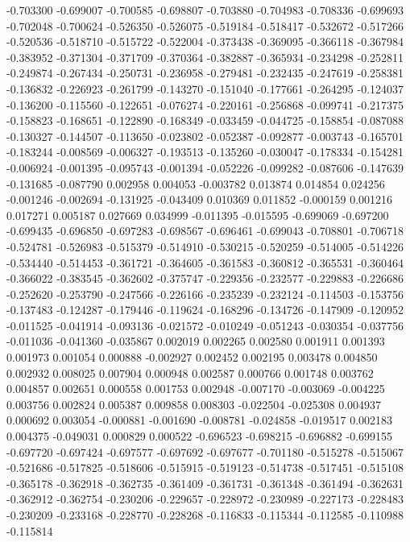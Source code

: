 -0.703300
-0.699007
-0.700585
-0.698807
-0.703880
-0.704983
-0.708336
-0.699693
-0.702048
-0.700624
-0.526350
-0.526075
-0.519184
-0.518417
-0.532672
-0.517266
-0.520536
-0.518710
-0.515722
-0.522004
-0.373438
-0.369095
-0.366118
-0.367984
-0.383952
-0.371304
-0.371709
-0.370364
-0.382887
-0.365934
-0.234298
-0.252811
-0.249874
-0.267434
-0.250731
-0.236958
-0.279481
-0.232435
-0.247619
-0.258381
-0.136832
-0.226923
-0.261799
-0.143270
-0.151040
-0.177661
-0.264295
-0.124037
-0.136200
-0.115560
-0.122651
-0.076274
-0.220161
-0.256868
-0.099741
-0.217375
-0.158823
-0.168651
-0.122890
-0.168349
-0.033459
-0.044725
-0.158854
-0.087088
-0.130327
-0.144507
-0.113650
-0.023802
-0.052387
-0.092877
-0.003743
-0.165701
-0.183244
-0.008569
-0.006327
-0.193513
-0.135260
-0.030047
-0.178334
-0.154281
-0.006924
-0.001395
-0.095743
-0.001394
-0.052226
-0.099282
-0.087606
-0.147639
-0.131685
-0.087790
0.002958
0.004053
-0.003782
0.013874
0.014854
0.024256
-0.001246
-0.002694
-0.131925
-0.043409
0.010369
0.011852
-0.000159
0.001216
0.017271
0.005187
0.027669
0.034999
-0.011395
-0.015595
-0.699069
-0.697200
-0.699435
-0.696850
-0.697283
-0.698567
-0.696461
-0.699043
-0.708801
-0.706718
-0.524781
-0.526983
-0.515379
-0.514910
-0.530215
-0.520259
-0.514005
-0.514226
-0.534440
-0.514453
-0.361721
-0.364605
-0.361583
-0.360812
-0.365531
-0.360464
-0.366022
-0.383545
-0.362602
-0.375747
-0.229356
-0.232577
-0.229883
-0.226686
-0.252620
-0.253790
-0.247566
-0.226166
-0.235239
-0.232124
-0.114503
-0.153756
-0.137483
-0.124287
-0.179446
-0.119624
-0.168296
-0.134726
-0.147909
-0.120952
-0.011525
-0.041914
-0.093136
-0.021572
-0.010249
-0.051243
-0.030354
-0.037756
-0.011036
-0.041360
-0.035867
0.002019
0.002265
0.002580
0.001911
0.001393
0.001973
0.001054
0.000888
-0.002927
0.002452
0.002195
0.003478
0.004850
0.002932
0.008025
0.007904
0.000948
0.002587
0.000766
0.001748
0.003762
0.004857
0.002651
0.000558
0.001753
0.002948
-0.007170
-0.003069
-0.004225
0.003756
0.002824
0.005387
0.009858
0.008303
-0.022504
-0.025308
0.004937
0.000692
0.003054
-0.000881
-0.001690
-0.008781
-0.024858
-0.019517
0.002183
0.004375
-0.049031
0.000829
0.000522
-0.696523
-0.698215
-0.696882
-0.699155
-0.697720
-0.697424
-0.697577
-0.697692
-0.697677
-0.701180
-0.515278
-0.515067
-0.521686
-0.517825
-0.518606
-0.515915
-0.519123
-0.514738
-0.517451
-0.515108
-0.365178
-0.362918
-0.362735
-0.361409
-0.361731
-0.361348
-0.361494
-0.362631
-0.362912
-0.362754
-0.230206
-0.229657
-0.228972
-0.230989
-0.227173
-0.228483
-0.230209
-0.233168
-0.228770
-0.228268
-0.116833
-0.115344
-0.112585
-0.110988
-0.115814
